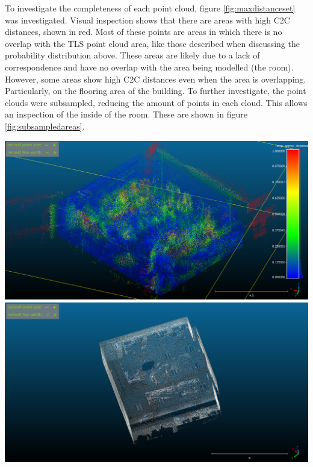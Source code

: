 \documentclass[man]{apa7}
\begin{document}
To investigate the completeness of each point cloud, figure \ref{fig:maxdistanceset} was investigated. Visual inspection shows that there are areas with high C2C distances, shown in red. Most of these points are areas in which there is no overlap with the TLS point cloud area, like those described when discussing the probability distribution above. These areas are likely due to a lack of correspondence and have no overlap with the area being modelled (the room). However, some areas show high C2C distances even when the area is overlapping. Particularly, on the flooring area of the building. To further investigate, the point clouds were subsampled, reducing the amount of points in each cloud. This allows an inspection of the inside of the room. These are shown in figure \ref{fig:subsampledareas}.

\begin{minipage}{\linewidth}
  \includegraphics[height=\textheight/4 ,width=\textwidth/2]{figures/subsampledMLS.png}
  \includegraphics[height=\textheight/4 ,width=\textwidth/2]{figures/subsampledTLS.png}
  \label{fig:subsampledareas}
\end{minipage}
\end{document}
